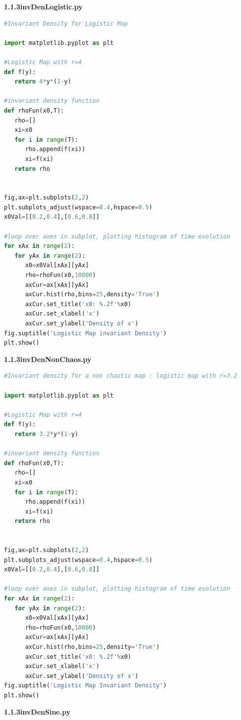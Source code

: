 \documentclass[11pt]{article}
\begin{document}
      \vspace{10mm}
      \textbf{1.1.3invDenLogistic.py}
      \begin{lstlisting}[backgroundcolor = \color{mygray},breaklines=true,language=Python]
#Invariant Density for Logistic Map

import matplotlib.pyplot as plt

#Logistic Map with r=4
def f(y):
   return 4*y*(1-y)

#invariant density function
def rhoFun(x0,T):
   rho=[]
   xi=x0
   for i in range(T):
      rho.append(f(xi))
      xi=f(xi)
   return rho


fig,ax=plt.subplots(2,2)
plt.subplots_adjust(wspace=0.4,hspace=0.5)
x0Val=[[0.2,0.4],[0.6,0.8]]

#loop over axes in subplot, plotting histogram of time evolution
for xAx in range(2):
   for yAx in range(2):
      x0=x0Val[xAx][yAx]
      rho=rhoFun(x0,10000)
      axCur=ax[xAx][yAx]
      axCur.hist(rho,bins=25,density='True')
      axCur.set_title('x0: %.2f'%x0)
      axCur.set_xlabel('x')
      axCur.set_ylabel('Density of x')
fig.suptitle('Logistic Map invariant Density')
plt.show()
      \end{lstlisting}
      \vspace{10mm}
      \textbf{1.1.3invDenNonChaos.py}
      \begin{lstlisting}[backgroundcolor = \color{mygray},breaklines=true,language=Python]
#Invariant density for a non chaotic map : logistic map with r=3.2

import matplotlib.pyplot as plt

#Logistic Map with r=4
def f(y):
   return 3.2*y*(1-y)

#invariant density function
def rhoFun(x0,T):
   rho=[]
   xi=x0
   for i in range(T):
      rho.append(f(xi))
      xi=f(xi)
   return rho


fig,ax=plt.subplots(2,2)
plt.subplots_adjust(wspace=0.4,hspace=0.5)
x0Val=[[0.2,0.4],[0.6,0.8]]

#loop over axes in subplot, plotting histogram of time evolution
for xAx in range(2):
   for yAx in range(2):
      x0=x0Val[xAx][yAx]
      rho=rhoFun(x0,10000)
      axCur=ax[xAx][yAx]
      axCur.hist(rho,bins=25,density='True')
      axCur.set_title('x0: %.2f'%x0)
      axCur.set_xlabel('x')
      axCur.set_ylabel('Density of x')
fig.suptitle('Logistic Map Invariant Density')
plt.show()
      \end{lstlisting}
      \vspace{10mm}
      \textbf{1.1.3invDenSine.py}
\end{document}
